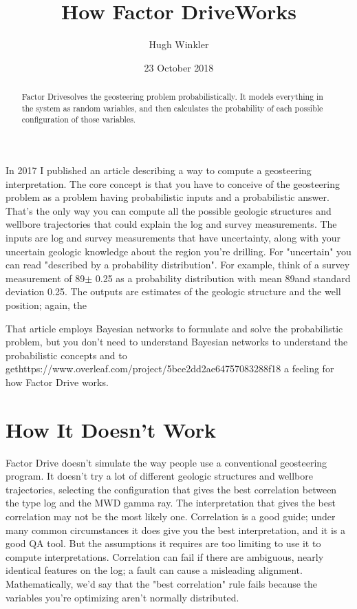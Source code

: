 \documentclass{tufte-handout}
\title{How Factor Drive\texttrademark Works}
\author[Hugh Winkler]{Hugh Winkler}
\date{23 October 2018}  %
\begin{document}
\maketitle%

\begin{abstract}
\noindent
Factor Drive\texttrademark solves the geosteering problem probabilistically.
It models everything in the system as random variables, and then  
calculates the probability of each possible configuration of those variables.
\end{abstract}


In 2017 I published an article\cite{Winkler2017}  describing a way to
compute a geosteering interpretation. The core concept is that
you have to conceive of the geosteering problem as a
problem having probabilistic inputs and a probabilistic answer. 
That's the only way you can compute all the
possible geologic structures and wellbore trajectories that could explain the log
and survey measurements.
The inputs are log and survey measurements that have uncertainty,
along with your uncertain geologic knowledge about the region you're drilling.
For "uncertain" you can read "described by a probability distribution".
For example, think of a survey measurement of 89\textdegree $\pm$ 0.25\textdegree 
as a probability distribution with mean 89\textdegree and standard deviation 
0.25\textdegree.
The outputs are estimates of the geologic structure and the well position;
again, the 

That article employs Bayesian networks to formulate and solve the probabilistic problem, but you
don't need to understand Bayesian networks to understand the probabilistic concepts and to gethttps://www.overleaf.com/project/5bce2dd2ae64757083288f18
a feeling for how Factor Drive works. 

\section{How It Doesn't Work}\label{sec:how-it-doesnt-work}
Factor Drive doesn't simulate the way people use a conventional geosteering program.
It doesn't try a lot of different geologic structures and wellbore trajectories, selecting
the configuration that gives the best correlation between the type log and the MWD gamma ray. The
interpretation that gives the best correlation may not be the most likely one.
Correlation is a good guide; under many common circumstances it does give you the best
interpretation, and it is a good QA tool. But the assumptions it requires are too limiting to use it to compute interpretations.
Correlation can fail if there are ambiguous, nearly identical features on the log; a fault can cause a misleading alignment. Mathematically, we'd say that the "best correlation" rule fails because the variables you're optimizing aren't normally distributed.
\end{document}
